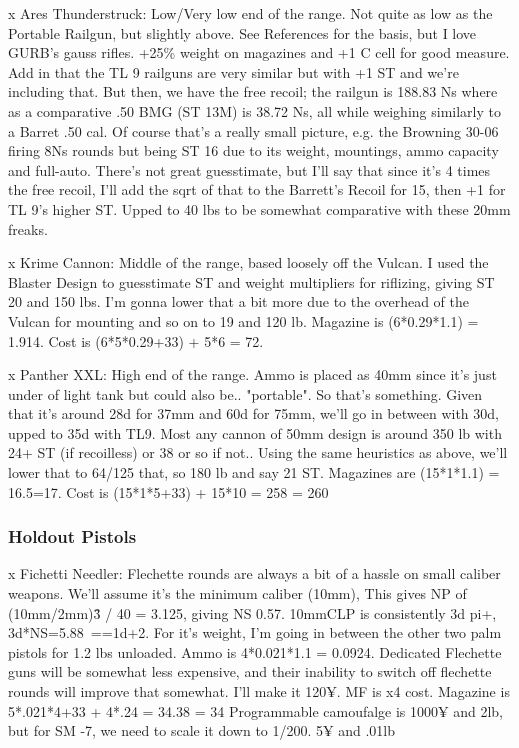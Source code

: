 \begin{multicols*}{2}
	x Ares Thunderstruck: Low/Very low end of the range. Not quite as low as the Portable Railgun, but slightly above. See References for the basis, but I love GURB's gauss rifles. +25\% weight on magazines and +1 C cell for good measure. Add in that the TL 9 railguns are very similar but with +1 ST and we're including that. But then, we have the free recoil; the railgun is 188.83 Ns where as a comparative .50 BMG (ST 13M) is 38.72 Ns, all while weighing similarly to a Barret .50 cal. Of course that's a really small picture, e.g. the Browning 30-06 firing 8Ns rounds but being ST 16 due to its weight, mountings, ammo capacity and full-auto. There's not great guesstimate, but I'll say that since it's 4 times the free recoil, I'll add the sqrt of that to the Barrett's Recoil for 15, then +1 for TL 9's higher ST. Upped to 40 lbs to be somewhat comparative with these 20mm freaks.
	
	x Krime Cannon: Middle of the range, based loosely off the Vulcan. I used the Blaster Design to guesstimate ST and weight multipliers for riflizing, giving ST 20 and 150 lbs. I'm gonna lower that a bit more due to the overhead of the Vulcan for mounting and so on to 19 and 120 lb. Magazine is (6*0.29*1.1) = 1.914. Cost is (6*5*0.29+33) + 5*6 = 72.
	
	x Panther XXL:  High end of the range. Ammo is placed as 40mm since it's just under of light tank but could also be.. "portable". So that's something. Given that it's around 28d for 37mm and 60d for 75mm, we'll go in between with 30d, upped to 35d with TL9. Most any cannon of 50mm design is around 350 lb with 24+ ST (if recoilless) or 38 or so if not.. Using the same heuristics as above, we'll lower that to 64/125 that, so 180 lb and say 21 ST. Magazines are (15*1*1.1) = 16.5=17. Cost is  (15*1*5+33) + 15*10 = 258 = 260
	
	\subsubsection{Holdout Pistols}
	
	x Fichetti Needler: Flechette rounds are always a bit of a hassle on small caliber weapons. We'll assume it's the minimum caliber (10mm), This gives NP of (10mm/2mm)\^3 / 40 = 3.125, giving NS 0.57. 10mmCLP is consistently 3d pi+, 3d*NS=5.88~==1d+2. For it's weight, I'm going in between the other two palm pistols for 1.2 lbs unloaded. Ammo is 4*0.021*1.1 = 0.0924. Dedicated Flechette guns will be somewhat less expensive, and their inability to switch off flechette rounds will improve that somewhat. I'll make it 120¥. MF is x4 cost. Magazine is 5*.021*4+33 + 4*.24 = 34.38 = 34  Programmable camoufalge is 1000¥ and 2lb, but for SM -7, we need to scale it down to 1/200. 5¥ and .01lb
	

\end{multicols*}
